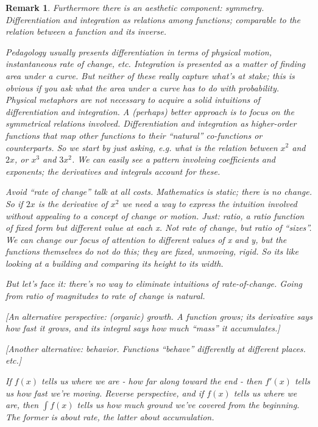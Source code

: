 \documentclass[reqno,12pt]{tufte-book}
\numberwithin{equation}{subsection}
\newtheorem{remark}{Remark}
\begin{document}
\begin{remark}
  Furthermore there is an aesthetic component: symmetry.
  Differentiation and integration as relations among functions;
  comparable to the relation between a function and its inverse.

  Pedagology usually presents differentiation in terms of physical
  motion, instantaneous rate of change, etc.  Integration is presented
  as a matter of finding area under a curve.  But neither of these
  really capture what's at stake; this is obvious if you ask what the
  area under a curve has to do with probability.  Physical metaphors
  are not necessary to acquire a solid intuitions of differentiation
  and integration.  A (perhaps) better approach is to focus on the
  symmetrical relations involved.  Differentiation and integration as
  higher-order functions that map other functions to their ``natural''
  co-functions or counterparts.  So we start by just asking, e.g. what
  is the relation between \(x^2\) and \(2x\), or \(x^3\) and \(3x^2\).
  We can easily see a pattern involving coefficients and exponents;
  the derivatives and integrals account for these.

  Avoid ``rate of change'' talk at all costs.  Mathematics is static;
  there is no change.  So if \(2x\) is the derivative of \(x^2\) we
  need a way to express the intuition involved without appealing to a
  concept of change or motion.  Just: ratio, a ratio function of fixed
  form but different value at each x.  Not rate of change, but ratio
  of ``sizes''.  We can change our focus of attention to different
  values of x and y, but the functions themselves do not do this; they
  are fixed, unmoving, rigid.  So its like looking at a building and
  comparing its height to its width.

  But let's face it: there's no way to eliminate intuitions of
  rate-of-change.  Going from ratio of magnitudes to rate of change is
  natural.

  [An alternative perspective: (organic) growth.  A function grows;
    its derivative says how fast it grows, and its integral says how
    much ``mass'' it accumulates.]

  [Another alternative: behavior.  Functions ``behave'' differently at
    different places. etc.]

  If \(f(x)\) tells us where we are - how far along toward the end -
  then \(f'(x)\) tells us how fast we're moving.  Reverse perspective,
  and if \(f(x)\) tells us where we are, then \(\int f(x)\) tells us
  how much ground we've covered from the beginning.  The former is
  about rate, the latter about accumulation.


\end{remark}
\end{document}
